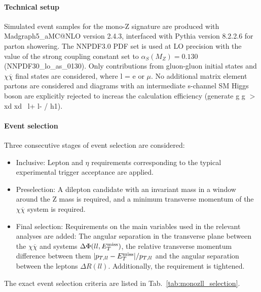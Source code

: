 \paragraph{Technical setup}
Simulated event samples for the mono-Z signature are produced with Madgraph5\_aMC@NLO version 2.4.3, interfaced with Pythia version 8.2.2.6 for parton showering. The NNPDF3.0 PDF set is used at LO precision with the value of the strong coupling constant set to $\alpha_{S}(M_{Z}) = 0.130$ (NNPDF30\_lo\_as\_0130). Only contributions from gluon-gluon initial states and \lp\lm$\chi\overline{\chi}$ final states are considered, where l = e or $\mu$. No additional matrix element partons are considered and diagrams with an intermediate s-channel SM Higgs boson are explicitly rejected to increas the calculation efficiency (generate g g $>$ xd xd~ l+ l- / h1). 

\paragraph{Event selection}
Three consecutive stages of event selection are considered:
\begin{itemize}
\item Inclusive: Lepton \pt and $\eta$ requirements corresponding to the typical experimental trigger acceptance are applied.

\item Preselection: A dilepton candidate with an invariant mass in a window around the Z mass is required, and a minimum transverse momentum of the $\chi\overline{\chi}$ system is required.

\item Final selection: Requirements on the main variables used in the relevant analyses are added: The angular separation in the transverse plane between the $\chi\overline{\chi}$ and \lp\lm systems $\Delta\Phi(ll,E_T^\mathrm{miss})$, the relative transverse momentum difference between them $|p_{T,ll} - E_T^\mathrm{miss}|/p_{T,ll}$ and the angular separation between the leptons $\Delta R(ll)$. Additionally, the \MET requirement is tightened.
\end{itemize}

The exact event selection criteria are listed in Tab.~\ref{tab:monozll_selection}.

